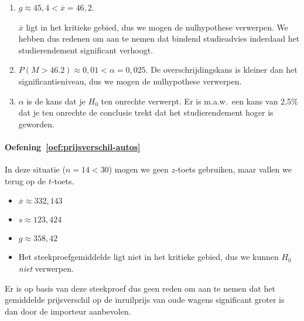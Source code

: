 \begin{enumerate}
  \item $g \approx 45,4 < \overline{x} = 46,2$.
  
  $\overline{x}$ ligt in het kritieke gebied, dus we mogen de nulhypothese verwerpen. We hebben dus redenen om aan te nemen dat bindend studieadvies inderdaad het studierendement significant verhoogt.
  
  \item $P(M > 46.2) \approx 0,01 < \alpha = 0,025$. De overschrijdingskans is kleiner dan het significantieniveau, dus we mogen de nulhypothese verwerpen.
  
  \item  $\alpha$ is de kans dat je $H_{0}$ ten onrechte verwerpt. Er is m.a.w.~een kans van 2,5\% dat je ten onrechte de conclusie trekt dat het studierendement hoger is geworden.
\end{enumerate}

\paragraph{Oefening~\ref{oef:prijsverschil-autos}}

In deze situatie ($n = 14 < 30$) mogen we geen $z$-toets gebruiken, maar vallen we terug op de $t$-toets.

\begin{itemize}
  \item $\overline{x} \approx 332,143$
  \item $s \approx 123,424$
  \item $g \approx 358,42$
  \item Het steekproefgemiddelde ligt niet in het kritieke gebied, dus we kunnen $H_0$ \emph{niet} verwerpen.
\end{itemize}

Er is op basis van deze steekproef dus geen reden om aan te nemen dat het gemiddelde prijsverschil op de inruilprijs van oude wagens significant groter is dan door de importeur aanbevolen.
